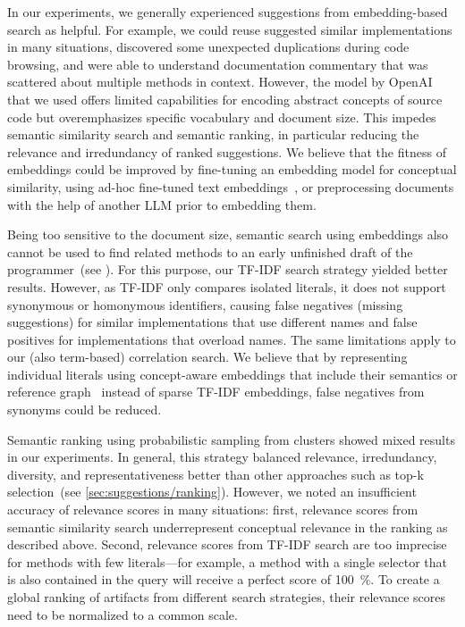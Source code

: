 In our experiments, we generally experienced suggestions from embedding-based search as helpful.
For example, we could reuse suggested similar implementations in many situations, discovered some unexpected duplications during code browsing, and were able to understand documentation commentary that was scattered about multiple methods in context.
However, the  model by OpenAI that we used offers limited capabilities for encoding abstract concepts of source code but overemphasizes specific vocabulary and document size.
This impedes semantic similarity search and semantic ranking, in particular reducing the relevance and irredundancy of ranked suggestions.
We believe that the fitness of embeddings could be improved by fine-tuning an embedding model for conceptual similarity, using ad-hoc fine-tuned text embeddings~\cite{su2023one}, or preprocessing documents with the help of another LLM prior to embedding them.

Being too sensitive to the document size, semantic search using embeddings also cannot be used to find related methods to an early unfinished draft of the programmer~(see ).
For this purpose, our TF-IDF search strategy yielded better results.
However, as TF-IDF only compares isolated literals, it does not support synonymous or homonymous identifiers, causing false negatives (missing suggestions) for similar implementations that use different names and false positives for implementations that overload names.
The same limitations apply to our (also term-based) correlation search.
We believe that by representing individual literals using concept-aware embeddings that include their semantics or reference graph~\cite{mattis2018semantic} instead of sparse TF-IDF embeddings, false negatives from synonyms could be reduced.

Semantic ranking using probabilistic sampling from clusters showed mixed results in our experiments.
In general, this strategy balanced relevance, irredundancy, diversity, and representativeness better than other approaches such as top-k selection~(see \cref{sec:suggestions/ranking}).
However, we noted an insufficient accuracy of relevance scores in many situations:
first, relevance scores from semantic similarity search underrepresent conceptual relevance in the ranking as described above.
Second, relevance scores from TF-IDF search are too imprecise for methods with few literals---for example, a method with a single selector that is also contained in the query will receive a perfect score of \qty{100}{\percent}.
To create a global ranking of artifacts from different search strategies, their relevance scores need to be normalized to a common scale.

